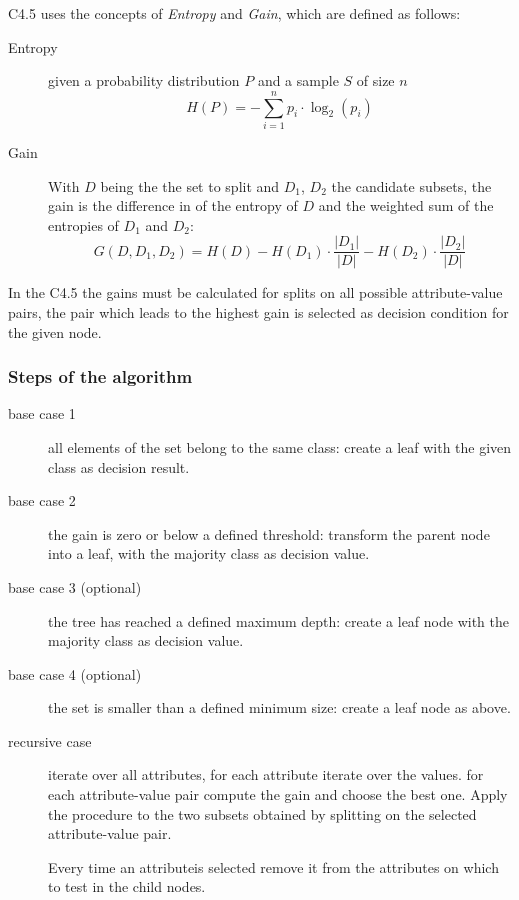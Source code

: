\documentclass[a4paper]{usiinfbachelorproject}
\begin{document}
C4.5 uses the concepts of \emph{Entropy} and \emph{Gain},
which are defined as follows:

\begin{description}

	\item[Entropy]
	given a probability distribution $P$ and a sample $S$ of size $n$
	$$H(P) = - \sum_{i=1}^n p_i \cdot \log_2 (p_i)$$
	
	\item[Gain]
	With $D$ being the the set to split and $D_1$, $D_2$ the candidate subsets,
	the gain is the difference in of the entropy of $D$ and the weighted
	sum of the entropies of $D_1$ and $D_2$:
	$$G(D, D_1, D_2) = H(D) - H(D_1)\cdot \frac{|D_1|}{|D|} - H(D_2) \cdot \frac{|D_2|}{|D|}$$
	
\end{description}

In the C4.5 the gains must be calculated for splits on all possible
attribute-value pairs, the pair which leads to the highest gain is
selected as decision condition for the given node.

	\subsubsection{\textbf{Steps of the algorithm}}
	
\begin{description}

	\item[base case 1]
	all elements of the set belong to the same class: create
	a leaf with the given class as decision result.
	
	\item[base case 2]
	the gain is zero or below a defined threshold:
	transform the parent node into a leaf, with the majority class as 
	decision value.
	
	\item[base case 3 (optional)]
	the tree has reached a defined maximum depth: create a leaf node with the majority class as 
	decision value.
	
	\item[base case 4 (optional)]
	the set is smaller than a defined minimum size: create a leaf node as above.

	\item[recursive case]
iterate over all attributes, for each attribute iterate over the values. for
each attribute-value pair compute the gain and choose the best one.
Apply the procedure to the two subsets obtained by splitting on the selected attribute-value pair.

Every time an attributeis selected remove it from the attributes on which to test in the child nodes.

\end{description}
\end{document}
